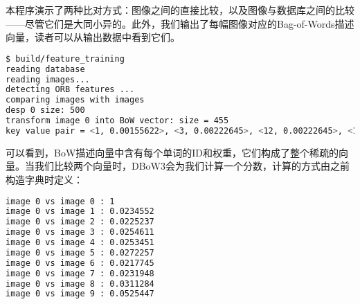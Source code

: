 本程序演示了两种比对方式：图像之间的直接比较，以及图像与数据库之间的比较——尽管它们是大同小异的。此外，我们输出了每幅图像对应的Bag-of-Words描述向量，读者可以从输出数据中看到它们。

\begin{lstlisting}[language=sh,caption=终端输出：]
$ build/feature_training
reading database
reading images... 
detecting ORB features ... 
comparing images with images 
desp 0 size: 500
transform image 0 into BoW vector: size = 455
key value pair = <1, 0.00155622>, <3, 0.00222645>, <12, 0.00222645>, <13, 0.00222645>, <14, 0.00222645>, <22, 0.00222645>, <33, 0.00222645>, <37, 0.00155622>, <38, 0.00222645>, <39, 0.00222645>, <43, 0.00222645>, <57, 0.00155622> ......
\end{lstlisting}

可以看到，BoW描述向量中含有每个单词的ID和权重，它们构成了整个稀疏的向量。当我们比较两个向量时，DBoW3会为我们计算一个分数，计算的方式由之前构造字典时定义：

\begin{lstlisting}[language=sh,caption=终端输出：]
image 0 vs image 0 : 1
image 0 vs image 1 : 0.0234552
image 0 vs image 2 : 0.0225237
image 0 vs image 3 : 0.0254611
image 0 vs image 4 : 0.0253451
image 0 vs image 5 : 0.0272257
image 0 vs image 6 : 0.0217745
image 0 vs image 7 : 0.0231948
image 0 vs image 8 : 0.0311284
image 0 vs image 9 : 0.0525447
\end{lstlisting}

